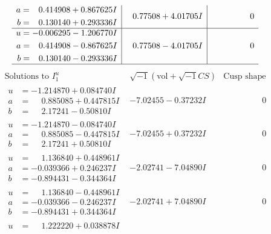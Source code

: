 \documentclass[1p]{elsarticle_modified}
\theoremstyle{definition}
\newcommand{\I}{\sqrt{-1}}
\begin{document}
$$\begin{array}{c|c|c}
\begin{aligned}
a &= \phantom{-}0.414908 + 0.867625 I \\
b &= \phantom{-}0.130140 + 0.293336 I\end{aligned}
 & \phantom{-}0.77508 + 4.01705 I & \phantom{-0.000000 } 0 \\ \hline\begin{aligned}
u &= -0.006295 - 1.206770 I \\
a &= \phantom{-}0.414908 - 0.867625 I \\
b &= \phantom{-}0.130140 - 0.293336 I\end{aligned}
 & \phantom{-}0.77508 - 4.01705 I & \phantom{-0.000000 } 0\\
 \hline 
 \end{array}$$\newpage$$\begin{array}{c|c|c}  
\text{Solutions to }I^u_{1}& \I (\text{vol} + \sqrt{-1}CS) & \text{Cusp shape}\\
 \hline 
\begin{aligned}
u &= -1.214870 + 0.084740 I \\
a &= \phantom{-}0.885085 + 0.447815 I \\
b &= \phantom{-}2.17241 - 0.50810 I\end{aligned}
 & -7.02455 - 0.37232 I & \phantom{-0.000000 } 0 \\ \hline\begin{aligned}
u &= -1.214870 - 0.084740 I \\
a &= \phantom{-}0.885085 - 0.447815 I \\
b &= \phantom{-}2.17241 + 0.50810 I\end{aligned}
 & -7.02455 + 0.37232 I & \phantom{-0.000000 } 0 \\ \hline\begin{aligned}
u &= \phantom{-}1.136840 + 0.448961 I \\
a &= -0.039366 + 0.246237 I \\
b &= -0.894431 - 0.344364 I\end{aligned}
 & -2.02741 - 7.04890 I & \phantom{-0.000000 } 0 \\ \hline\begin{aligned}
u &= \phantom{-}1.136840 - 0.448961 I \\
a &= -0.039366 - 0.246237 I \\
b &= -0.894431 + 0.344364 I\end{aligned}
 & -2.02741 + 7.04890 I & \phantom{-0.000000 } 0 \\ \hline\begin{aligned}
u &= \phantom{-}1.222220 + 0.038878 I \\

\end{aligned}
\end{array}$$
\end{document}
